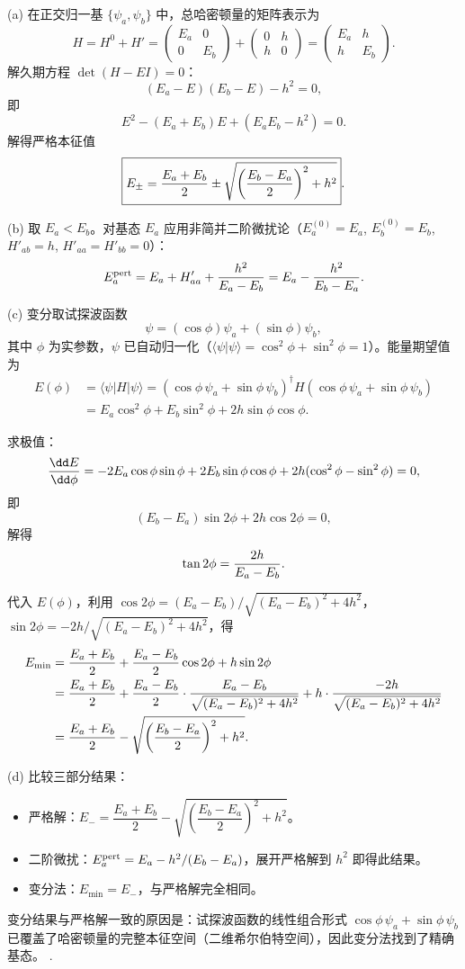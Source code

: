 \begin{solution}
(a) 在正交归一基 $\{\psi_a,\psi_b\}$ 中，总哈密顿量的矩阵表示为
\[
H=H^0+H'=\begin{pmatrix}E_a&0\\0&E_b\end{pmatrix}
+\begin{pmatrix}0&h\\h&0\end{pmatrix}
=\begin{pmatrix}E_a&h\\h&E_b\end{pmatrix}.
\]
解久期方程 $\det(H-EI)=0$：
\[
(E_a-E)(E_b-E)-h^2=0,
\]
即
\[
E^2-(E_a+E_b)E+(E_aE_b-h^2)=0.
\]
解得严格本征值
\[
\boxed{E_\pm={E_a+E_b\over2}\pm\sqrt{\left({E_b-E_a\over2}\right)^2+h^2}}.
\]

(b) 取 $E_a<E_b$。对基态 $E_a$ 应用非简并二阶微扰论（$E_a^{(0)}=E_a$, $E_b^{(0)}=E_b$, $H'_{ab}=h$, $H'_{aa}=H'_{bb}=0$）：
\[
E_a^{\rm pert}=E_a+{H'_{aa}}+{h^2\over E_a-E_b}
=E_a-{h^2\over E_b-E_a}.
\]

(c) 变分取试探波函数
\[
\psi=(\cos\phi)\psi_a+(\sin\phi)\psi_b,
\]
其中 $\phi$ 为实参数，$\psi$ 已自动归一化（$\langle\psi|\psi\rangle=\cos^2\phi+\sin^2\phi=1$）。能量期望值为
\[
\begin{aligned}
E(\phi)&=\langle\psi|H|\psi\rangle
=(\cos\phi\,\psi_a+\sin\phi\,\psi_b)^\dagger H(\cos\phi\,\psi_a+\sin\phi\,\psi_b)\\
&=E_a\cos^2\phi+E_b\sin^2\phi+2h\sin\phi\cos\phi.
\end{aligned}
\]

求极值：
\[
{\dd E\over\dd\phi}=-2E_a\cos\phi\sin\phi+2E_b\sin\phi\cos\phi+2h(\cos^2\phi-\sin^2\phi)=0,
\]
即
\[
(E_b-E_a)\sin2\phi+2h\cos2\phi=0,
\]
解得
\[
\tan2\phi={2h\over E_a-E_b}.
\]

代入 $E(\phi)$，利用 $\cos2\phi=(E_a-E_b)/\sqrt{(E_a-E_b)^2+4h^2}$，$\sin2\phi=-2h/\sqrt{(E_a-E_b)^2+4h^2}$，得
\[
\begin{aligned}
E_{\min}&={E_a+E_b\over2}+{E_a-E_b\over2}\cos2\phi+h\sin2\phi\\
&={E_a+E_b\over2}+{E_a-E_b\over2}\cdot{E_a-E_b\over\sqrt{(E_a-E_b)^2+4h^2}}
+h\cdot{-2h\over\sqrt{(E_a-E_b)^2+4h^2}}\\
&={E_a+E_b\over2}-\sqrt{\left({E_b-E_a\over2}\right)^2+h^2}.
\end{aligned}
\]

(d) 比较三部分结果：
\begin{itemize}
\item 严格解：$E_-=\dfrac{E_a+E_b}{2}-\sqrt{\left(\dfrac{E_b-E_a}{2}\right)^2+h^2}$。
\item 二阶微扰：$E_a^{\rm pert}=E_a-h^2/(E_b-E_a)$，展开严格解到 $h^2$ 即得此结果。
\item 变分法：$E_{\min}=E_-$，与严格解完全相同。
\end{itemize}
变分结果与严格解一致的原因是：试探波函数的线性组合形式 $\cos\phi\,\psi_a+\sin\phi\,\psi_b$ 已覆盖了哈密顿量的完整本征空间（二维希尔伯特空间），因此变分法找到了精确基态。
.
\end{solution}

